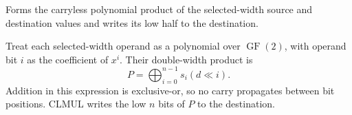Forms the carryless polynomial product of the selected-width source and destination values and writes its low half to the destination.


Treat each selected-width operand as a polynomial over \(\operatorname{GF}(2)\), with operand bit \(i\) as the coefficient of \(x^i\). Their double-width product is
\[
  P = \bigoplus_{i=0}^{n-1} s_i (d \ll i) .
\]
Addition in this expression is exclusive-or, so no carry propagates between bit positions. CLMUL writes the low \(n\) bits of \(P\) to the destination.
